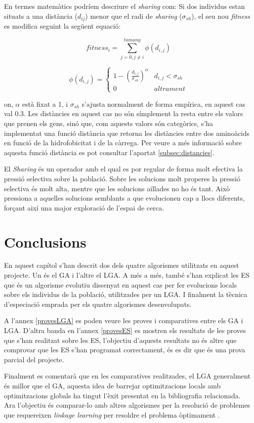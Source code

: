 \documentclass[titlepage,a4paper,12pt]{book}
\begin{document}
En termes matemàtics podríem descriure el \emph{sharing} com: Si dos individus
estan situats a una distància ($d_{ij}$) menor que el radi de \emph{sharing}
($\sigma_{sh}$), el seu nou \emph{fitness} es modifica seguint la següent
equació:

\[ fitness_i=\sum\limits^{tamany}_{j=0,j \neq i}\phi(d_{i,j}) \]

\[ \phi(d_{i,j})=\left\{ \begin{array}{ll}
1-\left(\frac{d_{i,j}}{\sigma_{sh}}\right)^\alpha & d_{i,j}<\sigma_{sh}\\ 0 &
altrament \end{array} \right.  \]

on, $\alpha$ està fixat a 1, i $\sigma_{sh}$ s'ajusta normalment de forma
empírica, en aquest cas val 0.3. Les distàncies en aquest cas no són símplement
la resta entre els valors que prenen els gens, sinó que, com aquests valors són
categòrics, s'ha implementat una funció distància que retorna les distàncies
entre dos aminoàcids en funció de la hidrofobicitat i de la càrrega. Per veure a
més informació sobre aquesta funció distància es pot consultar l'apartat
\ref{subsec:distancies}.

El \emph{Sharing} és un operador amb el qual es por regular de forma molt
efectiva la pressió selectiva sobre la població. Sobre les solucions molt
properes la pressió selectiva és molt alta, mentre que les solucions aïllades no
ho és tant. Això pressiona a aquelles solucions semblants a que evolucionen cap
a llocs diferents, forçant així una major exploració de l'espai de cerca.

\section{Conclusions} En aquest capítol s'han descrit dos dels quatre algorismes
utilitzats en aquest projecte. Un és el GA i l'altre el LGA. A més a més, també
s'han explicat les ES que és un algorisme evolutiu dissenyat en aquest cas per
fer evolucions locals sobre els individus de la població, utilitzades per un
LGA. I finalment la tècnica d'especiació emprada per els quatre algorismes
desenvolupats.

A l'annex \ref{provesLGA} es poden veure les proves i comparatives entre els GA
i LGA. D'altra banda en l'annex \ref{provesES} es mostren els resultats de les
proves que s'han realitzat sobre les ES, l'objectiu d'aquests resultats no és
altre que comprovar que les ES s'han programat correctament, és es dir que és
una prova parcial del projecte.

Finalment es comentarà que en les comparatives realitzades, el LGA generalment
és millor que el GA, aquesta idea de barrejar optimitzacions locals amb
optimitzacions globals ha tingut l'èxit presentat en la bibliografia
relacionada. Ara l'objectiu és comparar-lo amb altres algorismes per la
resolució de problemes que requereixen \emph{linkage learning} per resoldre el
problema òptimament \cite{G02}.

 

\end{document}
